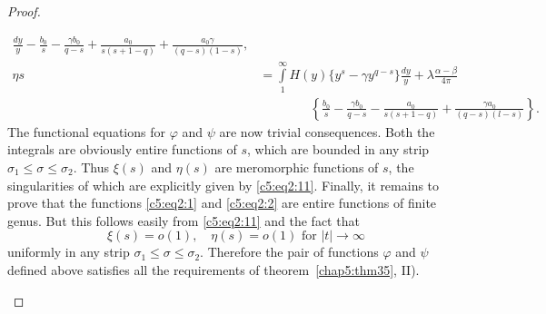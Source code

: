 \begin{proof}
\begin{enumerate}
{\begin{align*}
\frac{dy}{y} - \frac{b_0}{s} -\frac{\gamma b_0}{q-s} +
\frac{a_0}{s(s+1-q)} + \frac{a_0\gamma}{(q-s)(1-s)},\\
\eta{s} & = \int\limits^{\infty}_1 H(y) \{y^s-\gamma y^{q-s}\}
\frac{dy}{y} + \lambda \frac{\alpha-\beta}{4\pi}\\ 
&\qquad\qquad\left\{\frac{b_0}{s}
-\frac{\gamma b_0}{q-s} - \frac{a_0}{s(s+1-q)} + \frac{\gamma
a_0}{(q-s)(l-s)}\right\} \tag{11}.\label{c5:eq2:11} 
\end{align*}}\relax\pageoriginale
The functional equations for $\varphi$ and $\psi$ are now trivial
conse\-que\-nces. Both the integrals are obviously entire functions of
$s$, which are bounded in any strip $\sigma_1 \leq \sigma \leq
\sigma_2$. Thus $\xi(s)$ and $\eta(s)$ are meromorphic functions of
$s$, the singularities of which are explicitly given by \eqref{c5:eq2:11}. Finally,
it remains to prove that the functions \eqref{c5:eq2:1} and \eqref{c5:eq2:2} are entire
functions of finite genus. But this follows easily from \eqref{c5:eq2:11} and the
fact that
\begin{equation*}
\xi(s) = o (1), \quad \eta(s) = o (1) 
\text{ for } |t|\to \infty \tag{12}\label{c5:eq2:12}
\end{equation*}
uniformly in any strip $\sigma_1\leq \sigma \leq \sigma_2$. Therefore
the pair of functions $\varphi$ and $\psi$ defined above satisfies all
the requirements of theorem~\ref{chap5:thm35}, II).


\end{enumerate}
\end{proof}
